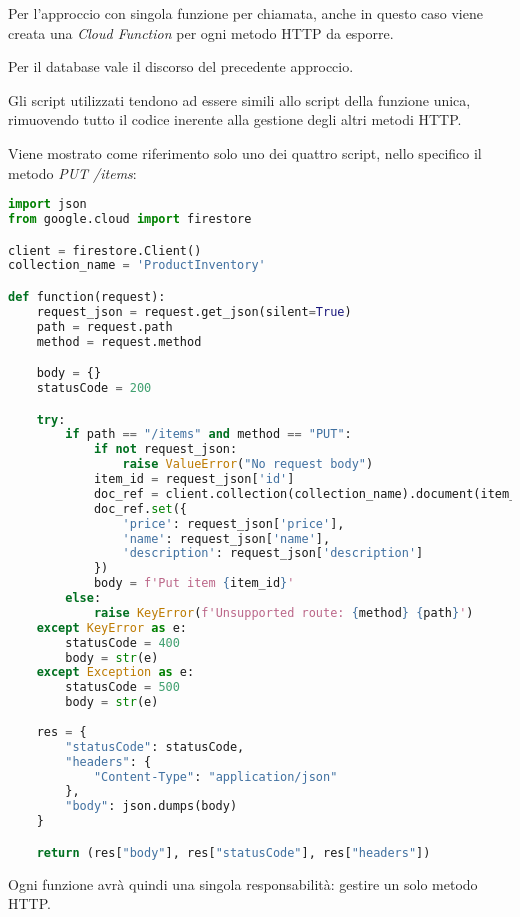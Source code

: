Per l'approccio con singola funzione per chiamata, anche in questo caso viene creata una \textit{Cloud Function} per ogni metodo HTTP da esporre.

Per il database vale il discorso del precedente approccio.

Gli script utilizzati tendono ad essere simili allo script della funzione unica, rimuovendo tutto il codice inerente alla gestione degli altri metodi HTTP.

Viene mostrato come riferimento solo uno dei quattro script, nello specifico il metodo \textit{PUT /items}:
\begin{lstlisting}[language=python]
import json
from google.cloud import firestore

client = firestore.Client()
collection_name = 'ProductInventory'

def function(request):
    request_json = request.get_json(silent=True)
    path = request.path
    method = request.method

    body = {}
    statusCode = 200

    try:
        if path == "/items" and method == "PUT":
            if not request_json:
                raise ValueError("No request body")
            item_id = request_json['id']
            doc_ref = client.collection(collection_name).document(item_id)
            doc_ref.set({
                'price': request_json['price'],
                'name': request_json['name'],
                'description': request_json['description']
            })
            body = f'Put item {item_id}'
        else:
            raise KeyError(f'Unsupported route: {method} {path}')
    except KeyError as e:
        statusCode = 400
        body = str(e)
    except Exception as e:
        statusCode = 500
        body = str(e)
    
    res = {
        "statusCode": statusCode,
        "headers": {
            "Content-Type": "application/json"
        },
        "body": json.dumps(body)
    }

    return (res["body"], res["statusCode"], res["headers"])
\end{lstlisting}
Ogni funzione avrà quindi una singola responsabilità: gestire un solo metodo HTTP.